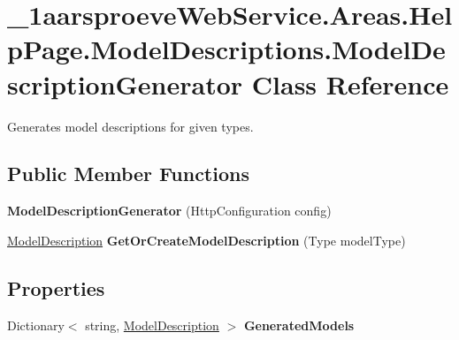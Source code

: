 \hypertarget{class__1aarsproeve_web_service_1_1_areas_1_1_help_page_1_1_model_descriptions_1_1_model_description_generator}{}\section{\+\_\+1aarsproeve\+Web\+Service.\+Areas.\+Help\+Page.\+Model\+Descriptions.\+Model\+Description\+Generator Class Reference}
\label{class__1aarsproeve_web_service_1_1_areas_1_1_help_page_1_1_model_descriptions_1_1_model_description_generator}


Generates model descriptions for given types.  


\subsection*{Public Member Functions}
\begin{DoxyCompactItemize}
\item 
\hypertarget{class__1aarsproeve_web_service_1_1_areas_1_1_help_page_1_1_model_descriptions_1_1_model_description_generator_a0f18212af9433afee89acbe3cc8de6be}{}{\bfseries Model\+Description\+Generator} (Http\+Configuration config)\label{class__1aarsproeve_web_service_1_1_areas_1_1_help_page_1_1_model_descriptions_1_1_model_description_generator_a0f18212af9433afee89acbe3cc8de6be}

\item 
\hypertarget{class__1aarsproeve_web_service_1_1_areas_1_1_help_page_1_1_model_descriptions_1_1_model_description_generator_a9404c6e00ceee0f3eee2301f975d15ab}{}\hyperlink{class__1aarsproeve_web_service_1_1_areas_1_1_help_page_1_1_model_descriptions_1_1_model_description}{Model\+Description} {\bfseries Get\+Or\+Create\+Model\+Description} (Type model\+Type)\label{class__1aarsproeve_web_service_1_1_areas_1_1_help_page_1_1_model_descriptions_1_1_model_description_generator_a9404c6e00ceee0f3eee2301f975d15ab}

\end{DoxyCompactItemize}
\subsection*{Properties}
\begin{DoxyCompactItemize}
\item 
\hypertarget{class__1aarsproeve_web_service_1_1_areas_1_1_help_page_1_1_model_descriptions_1_1_model_description_generator_a9a3ccc6d1bf37f5189f07f2a044568bb}{}Dictionary$<$ string, \hyperlink{class__1aarsproeve_web_service_1_1_areas_1_1_help_page_1_1_model_descriptions_1_1_model_description}{Model\+Description} $>$ {\bfseries Generated\+Models}\label{class__1aarsproeve_web_service_1_1_areas_1_1_help_page_1_1_model_descriptions_1_1_model_description_generator_a9a3ccc6d1bf37f5189f07f2a044568bb}

\end{DoxyCompactItemize}


